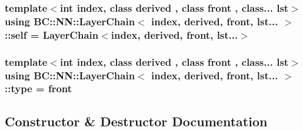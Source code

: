 \subsubsection[{\texorpdfstring{self}{self}}]{\setlength{\rightskip}{0pt plus 5cm}template$<$int index, class derived , class front , class... lst$>$ using {\bf B\+C\+::\+N\+N\+::\+Layer\+Chain}$<$ index, derived, front, lst... $>$\+::{\bf self} =  {\bf Layer\+Chain}$<$index, derived, front, lst...$>$}\hypertarget{structBC_1_1NN_1_1LayerChain_3_01index_00_01derived_00_01front_00_01lst_8_8_8_01_4_a499a7fa03d935cdffd2f53e4f290a657}{}\label{structBC_1_1NN_1_1LayerChain_3_01index_00_01derived_00_01front_00_01lst_8_8_8_01_4_a499a7fa03d935cdffd2f53e4f290a657}
\subsubsection[{\texorpdfstring{type}{type}}]{\setlength{\rightskip}{0pt plus 5cm}template$<$int index, class derived , class front , class... lst$>$ using {\bf B\+C\+::\+N\+N\+::\+Layer\+Chain}$<$ index, derived, front, lst... $>$\+::{\bf type} =  front}\hypertarget{structBC_1_1NN_1_1LayerChain_3_01index_00_01derived_00_01front_00_01lst_8_8_8_01_4_a2ff54527ca6ec72ad9d4a8d7307f8339}{}\label{structBC_1_1NN_1_1LayerChain_3_01index_00_01derived_00_01front_00_01lst_8_8_8_01_4_a2ff54527ca6ec72ad9d4a8d7307f8339}


\subsection{Constructor \& Destructor Documentation}
